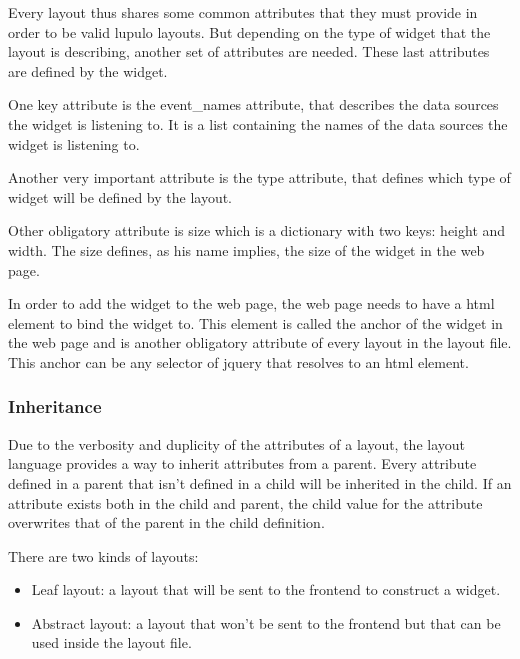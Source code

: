 \documentclass[12pt]{article}
\begin{document}
            Every layout thus shares some common attributes that they must
            provide in order to be valid lupulo layouts. But depending on the
            type of widget that the layout is describing, another set of
            attributes are needed. These last attributes are defined by the
            widget.

            One key attribute is the event\_names attribute, that describes the
            data sources the widget is listening to. It is a list containing the
            names of the data sources the widget is listening to.

            Another very important attribute is the type attribute, that defines
            which type of widget will be defined by the layout.

            Other obligatory attribute is size which is a dictionary with two
            keys: height and width. The size defines, as his name implies,
            the size of the widget in the web page.

            In order to add the widget to the web page, the web page needs to
            have a html element to bind the widget to. This element is called
            the anchor of the widget in the web page and is another obligatory
            attribute of every layout in the layout file. This anchor can be any
            selector of jquery that resolves to an html element.

            \subsubsection{Inheritance}
                Due to the verbosity and duplicity of the attributes of a
                layout, the layout language provides a way to inherit attributes
                from a parent. Every attribute defined in a parent that isn't
                defined in a child will be inherited in the child. If an
                attribute exists both in the child and parent, the child value
                for the attribute overwrites that of the parent in the child
                definition.

                There are two kinds of layouts:
                \begin{itemize}
                    \item Leaf layout: a layout that will be sent to the frontend
                          to construct a widget.
                    \item Abstract layout: a layout that won't be sent to the
                          frontend but that can be used inside the layout file.
                \end{itemize}
\end{document}
